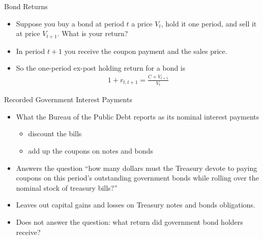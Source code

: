 \documentclass[professionalfonts,small]{beamer}
\begin{document}
\begin{frame}{Bond Returns}

\begin{itemize}

\item Suppose you buy a bond at period $t$ a price $V_t$, hold it one period, and sell it at price $V_{t+1}$.  What is your return?

\item In period $t+1$ you receive the coupon payment and the sales price.

\item So the one-period ex-post holding return for a bond is
\begin{eqnarray*}
1+r_{t,t+1} = \frac{C + V_{t+1}}{V_t}
\end{eqnarray*}

\end{itemize}

\end{frame}

\begin{frame}{Recorded Government Interest Payments}

\footnotesize

\begin{itemize}

\item What the Bureau of the Public Debt reports as its nominal interest payments
\begin{itemize}
\item discount the bills
\item add up the coupons on notes and bonds
\end{itemize}\medskip

\medskip

\item Answers the question ``how many dollars must
the Treasury devote to paying coupons on this period's outstanding
government bonds while rolling over the nominal stock of treasury
bills?''  \medskip

\medskip

\item Leaves out capital gains and losses on Treasury notes and bonds
obligations.

\medskip

\item Does not answer the question:  what return did government bond holders receive?

\end{itemize}
\end{frame}
\end{document}
